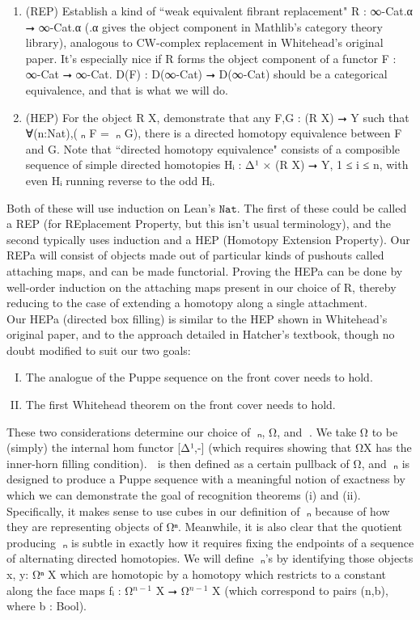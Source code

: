 \documentclass{book}
\theoremstyle{definition}
\begin{document}
\begin{enumerate}
\item (REP) Establish a kind of ``weak equivalent fibrant replacement" R : ∞-Cat.α ⭢ ∞-Cat.α (.α gives the object component in Mathlib's category theory library), analogous to CW-complex replacement in Whitehead's original paper. It's especially nice if R forms the object component of a functor F : ∞-Cat ⭢ ∞-Cat. D(F) : D(∞-Cat) ⭢ D(∞-Cat) should be a categorical equivalence, and that is what we will do.
\item (HEP) For the object R X, demonstrate that any F,G : (R X) ⭢ Y such that ∀(n:Nat),(π⃗ₙ F = π⃗ₙ G), there is a directed homotopy equivalence between F and G. Note that ``directed homotopy equivalence" consists of a composible sequence of simple directed homotopies Hᵢ : Δ¹ × (R X) ⭢ Y, 1 ≤ i ≤ n, with even Hᵢ running reverse to the odd Hᵢ.
\end{enumerate} 

Both of these will use induction on Lean's $\texttt{Nat}$. The first of these could be called a REP (for REplacement Property, but this isn't usual terminology), and the second typically uses induction and a HEP (Homotopy Extension Property). Our REPa will consist of objects made out of particular kinds of pushouts called attaching maps, and can be made functorial. Proving the HEPa can be done by well-order induction on the attaching maps present in our choice of R, thereby reducing to the case of extending a homotopy along a single attachment.\\

Our HEPa (directed box filling) is similar to the HEP shown in Whitehead's original paper, and to the approach detailed in Hatcher's textbook, though no doubt modified to suit our two goals:

\begin{enumerate}[(I)]
\item The analogue of the Puppe sequence on the front cover needs to hold.
\item The first Whitehead theorem on the front cover needs to hold.
\end{enumerate}

These two considerations determine our choice of π⃗ₙ, Ω⃗, and ω⃗. We take Ω⃗ to be (simply) the internal hom functor [Δ¹,-] (which requires showing that Ω⃗X has the inner-horn filling condition). ω⃗ is then defined as a certain pullback of Ω⃗, and π⃗ₙ is designed to produce a Puppe sequence with a meaningful notion of exactness by which we can demonstrate the goal of recognition theorems (i) and (ii). Specifically, it makes sense to use cubes in our definition of π⃗ₙ because of how they are representing objects of Ω⃗ⁿ. Meanwhile, it is also clear that the quotient producing π⃗ₙ is subtle in exactly how it requires fixing the endpoints of a sequence of alternating directed homotopies. We will define π⃗ₙ's by identifying those objects x, y: Ω⃗ⁿ X which are homotopic by a homotopy which restricts to a constant along the face maps fᵢ : Ω⃗${}^{n-1}$ X ⭢ Ω⃗${}^{n-1}$ X (which correspond to pairs (n,b), where b : Bool).\\
\end{document}

